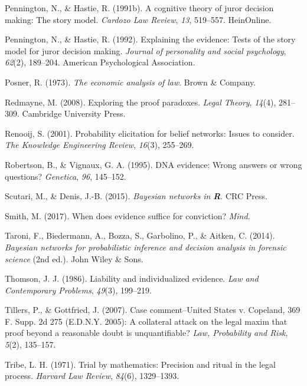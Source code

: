 \documentclass[11pt,dvipsnames,enabledeprecatedfontcommands]{scrartcl}
\begin{document}
\hypertarget{ref-pennington1991cognitive}{}
Pennington, N., \& Hastie, R. (1991b). A cognitive theory of juror
decision making: The story model. \emph{Cardozo Law Review}, \emph{13},
519--557. HeinOnline.

\hypertarget{ref-pennington1992explaining}{}
Pennington, N., \& Hastie, R. (1992). Explaining the evidence: Tests of
the story model for juror decision making. \emph{Journal of personality
and social psychology}, \emph{62}(2), 189--204. American Psychological
Association.

\hypertarget{ref-Posner1973}{}
Posner, R. (1973). \emph{The economic analysis of law}. Brown \&
Company.

\hypertarget{ref-redmayne2008exploring}{}
Redmayne, M. (2008). Exploring the proof paradoxes. \emph{Legal Theory},
\emph{14}(4), 281--309. Cambridge University Press.

\hypertarget{ref-renooij2001ProbabilityElicitationBeliefa}{}
Renooij, S. (2001). Probability elicitation for belief networks: Issues
to consider. \emph{The Knowledge Engineering Review}, \emph{16}(3),
255--269.

\hypertarget{ref-Robertson1995evidence}{}
Robertson, B., \& Vignaux, G. A. (1995). DNA evidence: Wrong answers or
wrong questions? \emph{Genetica}, \emph{96}, 145--152.

\hypertarget{ref-Scutari2015Bayesian-Networ}{}
Scutari, M., \& Denis, J.-B. (2015). \emph{Bayesian networks in
\textbf{R}}. CRC Press.

\hypertarget{ref-Smith_conviction_mind_2017}{}
Smith, M. (2017). When does evidence suffice for conviction?
\emph{Mind}.

\hypertarget{ref-taroni2006bayesian}{}
Taroni, F., Biedermann, A., Bozza, S., Garbolino, P., \& Aitken, C.
(2014). \emph{Bayesian networks for probabilistic inference and decision
analysis in forensic science} (2nd ed.). John Wiley \& Sons.

\hypertarget{ref-Thomson86}{}
Thomson, J. J. (1986). Liability and individualized evidence. \emph{Law
and Contemporary Problems}, \emph{49}(3), 199--219.

\hypertarget{ref-Tillers2007}{}
Tillers, P., \& Gottfried, J. (2007). Case comment--United States v.
Copeland, 369 F. Supp. 2d 275 (E.D.N.Y. 2005): A collateral attack on
the legal maxim that proof beyond a reasonable doubt is unquantifiable?
\emph{Law, Probability and Risk}, \emph{5}(2), 135--157.

\hypertarget{ref-tribe71}{}
Tribe, L. H. (1971). Trial by mathematics: Precision and ritual in the
legal process. \emph{Harvard Law Review}, \emph{84}(6), 1329--1393.
\end{document}
